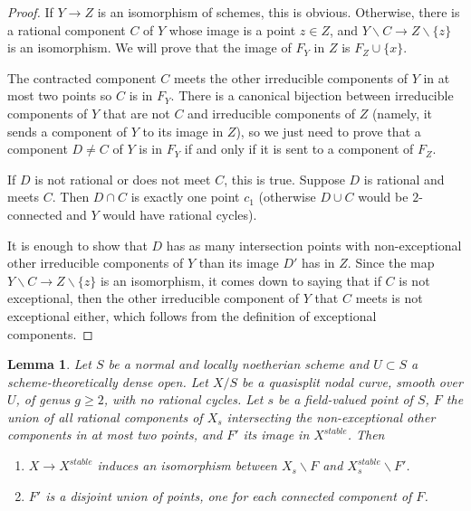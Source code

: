 \documentclass[a4paper,12pt]{amsart} %
\numberwithin{equation}{subsection}
\theoremstyle{definition}
\theoremstyle{plain}%
\newtheorem{lemma}[definition]{Lemma}
\theoremstyle{remark}
\begin{document}
\begin{proof}
If $Y\to Z$ is an isomorphism of schemes, this is obvious. Otherwise, there is a rational component $C$ of $Y$ whose image is a point $z\in Z$, and $Y\backslash C\to Z\backslash \{z\}$ is an isomorphism. We will prove that the image of $F_Y$ in $Z$ is $F_Z\cup\{x\}$.

The contracted component $C$ meets the other irreducible components of $Y$ in at most two points so $C$ is in $F_Y$. There is a canonical bijection between irreducible components of $Y$ that are not $C$ and irreducible components of $Z$ (namely, it sends a component of $Y$ to its image in $Z$), so we just need to prove that a component $D\neq C$ of $Y$ is in $F_Y$ if and only if it is sent to a component of $F_Z$.

If $D$ is not rational or does not meet $C$, this is true. Suppose $D$ is rational and meets $C$. Then $D\cap C$ is exactly one point $c_1$ (otherwise $D\cup C$ would be $2$-connected and $Y$ would have rational cycles).

It is enough to show that $D$ has as many intersection points with non-exceptional other irreducible components of $Y$ than its image $D'$ has in $Z$. Since the map $Y\backslash C\to Z\backslash \{z\}$ is an isomorphism, it comes down to saying that if $C$ is not exceptional, then the other irreducible component of $Y$ that $C$ meets is not exceptional either, which follows from the definition of exceptional components.
\end{proof}

\begin{lemma}\label{lemme les composantes avec <3 points sont contractees dans X^stable}
Let $S$ be a normal and locally noetherian scheme and $U\subset S$ a scheme-theoretically dense open. Let $X/S$ be a quasisplit nodal curve, smooth over $U$, of genus $g\geq 2$, with no rational cycles. Let $s$ be a field-valued point of $S$, $F$ the union of all rational components of $X_s$ intersecting the non-exceptional other components in at most two points, and $F'$ its image in $X^{stable}$. Then
\begin{enumerate}
\item $X\to X^{stable}$ induces an isomorphism between $X_s\backslash F$ and $X^{stable}_s\backslash F'$.
\item $F'$ is a disjoint union of points, one for each connected component of $F$. 
\end{enumerate}
\end{lemma}
\end{document}
